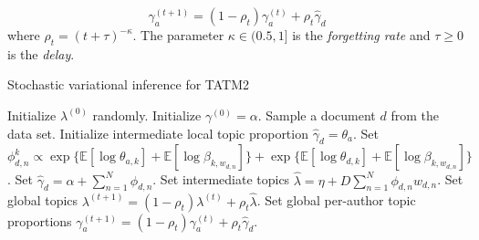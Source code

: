 \begin{equation}
\gamma^{(t+1)}_a = (1 - \rho_t) \gamma^{(t)}_a + \rho_t \hat{\gamma}_d
\end{equation}
%
where $\rho_t=(t + \tau)^{-\kappa}$. The parameter $\kappa\in(0.5,1]$ is the \textit{forgetting rate} and $\tau\geq0$ is the \textit{delay}.


\begin{algorithm}[tb]
\caption{Stochastic variational inference for TATM2}
\label{alg:stoch_tatm2}
\begin{algorithmic}[1]
	\STATE Initialize $\lambda^{(0)}$ randomly.
	\STATE Initialize $\gamma^{(0)} = \alpha$.
	\REPEAT
	\STATE Sample a document $d$ from the data set.
	\STATE Initialize intermediate local topic proportion $\hat{\gamma}_d = \theta_{a}$.
		\REPEAT
					\STATE Set $\phi^k_{d,n} \propto \exp \{ \mathbb{E}[\log \theta_{a,k}] + \mathbb{E}[\log \beta_{k,w_{d,n}}] \} + \exp \{ \mathbb{E}[\log \theta_{d,k}] + \mathbb{E}[\log \beta_{k,w_{d,n}}] \}$.
			\ENDFOR
			\STATE Set $\hat{\gamma}_d = \alpha + \sum_{n=1}^{N}{\phi_{d,n}}$.
		\STATE Set intermediate topics $\hat{\lambda} = \eta + D \sum_{n=1}^{N}{\phi_{d,n}w_{d,n}}$.
		\STATE Set global topics $\lambda^{(t+1)} = (1 - \rho_t) \lambda^{(t)} + \rho_t \hat{\lambda}$.
		\STATE Set global per-author topic proportions $\gamma^{(t+1)}_a = (1 - \rho_t) \gamma^{(t)}_a + \rho_t \hat{\gamma}_d$.
\end{algorithmic}
\end{algorithm}
